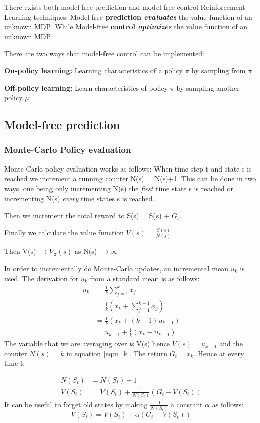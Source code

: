 There exists both model-free prediction and model-free control Reinforcement Learning techniques.
Model-free \textbf{prediction \textit{evaluates}} the value function of an unknown MDP.
While Model-free \textbf{control \textit{optimizes}} the value function of an unknown MDP.

There are two ways that model-free control can be implemented:

\textbf{On-policy learning:}
Learning characteristics of a policy $\pi$ by sampling from $\pi$

\textbf{Off-policy learning:}
Learn characteristics of policy $\pi$ by sampling another policy $\mu$

\subsection{Model-free prediction}
\subsubsection{Monte-Carlo Policy evaluation}
Monte-Carlo policy evaluation works as follows:
When time step t and state s is reached we increment a running counter N(s) = N(s)+1. This can be done in two ways, one being only incrementing N(s) the \textit{first} time state s is reached or incrementing N(s) \textit{every} time states s is reached.

Then we increment the total reward to S(s) =  S(s) + $G_t$.

Finally we calculate the value function $V(s)=\frac{S(s)}{N(s)}$

Then V(s) $\to V_\pi(s)$ as N(s) $\to \infty$

In order to incrementally do Monte-Carlo updates, an incremental mean $u_k$ is used. The derivation for $u_k$ from a standard mean is as follows:
\begin{align}
	u_k &= \frac{1}{k}\sum_{j=1}^{k}x_j\\
	&= \frac{1}{k}(x_k + \sum_{j=1}^{k-1}x_j)\\
	&= \frac{1}{k}(x_k +(k-1)u_{k-1})\\
	&= u_{k-1} + \frac{1}{k}(x_k - u_{k-1})
	\label{eq:u_k}
\end{align}
The variable that we are averaging over is V(s) hence $V(s)=u_{k-1}$ and the counter $N(s)=k$ in equation \ref{eq:u_k}. The return $G_t =x_k$. Hence at every time t:

\begin{align}
	N(S_t) &= N(S_t) + 1 \\
	V(S_t) &= V(S_t) + \frac{1}{N(S_t)}(G_t - V(S_t))
\end{align}
It can be useful to forget old states by making $\frac{1}{N(S_t)}$ a constant $\alpha$ as follows:
\begin{equation}
	V(S_t) = V(S_t) + \alpha(G_t - V(S_t))
	\label{eq:monte_carlo}
\end{equation}



